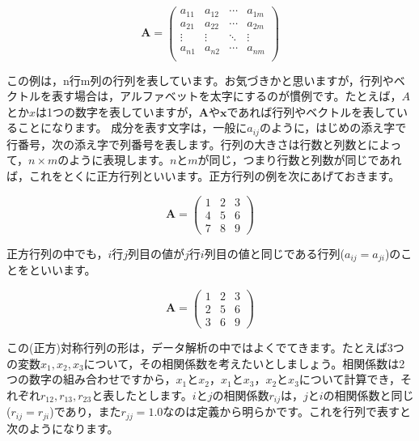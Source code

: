 \documentclass{ltjsbook}
\begin{document}
\begin{equation*}
	\bm{A}=
	\begin{pmatrix}
		a_{11} & a_{12} & \cdots & a_{1m} \\
		a_{21} & a_{22} & \cdots & a_{2m} \\
		\vdots & \vdots & \ddots & \vdots \\
		a_{n1} & a_{n2} & \cdots & a_{nm} \\
	\end{pmatrix}
\end{equation*}


この例は，n行m列の行列を表しています。お気づきかと思いますが，行列やベクトルを表す場合は，アルファベットを太字にするのが慣例です。たとえば，$A$とか$x$は1つの数字を表していますが，$\bm{A}$や$\bm{x}$であれば行列やベクトルを表していることになります。
成分を表す文字は，一般に$a_{ij}$のように，はじめの添え字で行番号，次の添え字で列番号を表します。行列の大きさは行数と列数とによって，$n \times m$のように表現します。$n$と$m$が同じ，つまり行数と列数が同じであれば，これをとくに正方行列といいます。正方行列の例を次にあげておきます。


\begin{equation*}
	\bm{A} =
	\begin{pmatrix}
		1 & 2 & 3 \\
		4 & 5 & 6 \\
		7 & 8 & 9
	\end{pmatrix}
\end{equation*}

正方行列の中でも，$i$行$j$列目の値が$j$行$i$列目の値と同じである行列($a_{ij}=a_{ji}$)のことをといいます。

\begin{equation*}
	\bm{A} =
	\begin{pmatrix}
		1 & 2 & 3 \\
		2 & 5 & 6 \\
		3 & 6 & 9
	\end{pmatrix}
\end{equation*}

この(正方)対称行列の形は，データ解析の中ではよくでてきます。たとえば3つの変数$x_1,x_2,x_3$について，その相関係数を考えたいとしましょう。相関係数は2つの数字の組み合わせですから，$x_1$と$x_2$，$x_1$と$x_3$，$x_2$と$x_3$について計算でき，それぞれ$r_{12},r_{13},r_{23}$と表したとします。$i$と$j$の相関係数$r_{ij}$は，$j$と$i$の相関係数と同じ($r_{ij}=r_{ji}$)であり，また$r_{jj}=1.0$なのは定義から明らかです。これを行列で表すと次のようになります。
\end{document}
